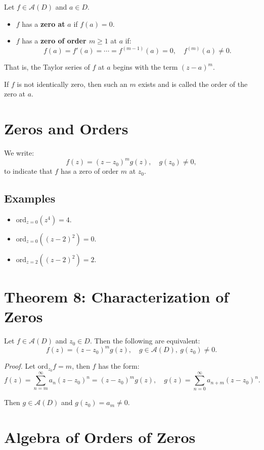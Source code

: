 \documentclass[12pt]{article}
\theoremstyle{definition} %
\theoremstyle{plain} %
\begin{document}
Let $f \in \mathcal{A}(D)$ and $a \in D$.

\begin{itemize}
    \item $f$ has a \textbf{zero at} $a$ if $f(a) = 0$.
    \item $f$ has a \textbf{zero of order $m \geq 1$} at $a$ if:
    \[
    f(a) = f'(a) = \cdots = f^{(m-1)}(a) = 0, \quad f^{(m)}(a) \neq 0.
    \]
\end{itemize}

That is, the Taylor series of $f$ at $a$ begins with the term $(z - a)^m$.

If $f$ is not identically zero, then such an $m$ exists and is called the order of the zero at $a$.
\section*{Zeros and Orders}

We write:
\[
f(z) = (z - z_0)^m g(z), \quad g(z_0) \neq 0,
\]
to indicate that $f$ has a zero of order $m$ at $z_0$.

\subsection*{Examples}

\begin{itemize}
    \item $\text{ord}_{z=0}(z^4) = 4$.
    \item $\text{ord}_{z=0}((z - 2)^2) = 0$.
    \item $\text{ord}_{z=2}((z - 2)^2) = 2$.
\end{itemize}

\section*{Theorem 8: Characterization of Zeros}

Let $f \in \mathcal{A}(D)$ and $z_0 \in D$. Then the following are equivalent:
\[
f(z) = (z - z_0)^m g(z), \quad g \in \mathcal{A}(D), \ g(z_0) \neq 0.
\]

\textit{Proof.} Let $\text{ord}_{z_0} f = m$, then $f$ has the form:
\[
f(z) = \sum_{n=m}^\infty a_n (z - z_0)^n = (z - z_0)^m g(z), \quad g(z) = \sum_{n=0}^\infty a_{n+m} (z - z_0)^n.
\]

Then $g \in \mathcal{A}(D)$ and $g(z_0) = a_m \neq 0$.

\section*{Algebra of Orders of Zeros}
\end{document}
